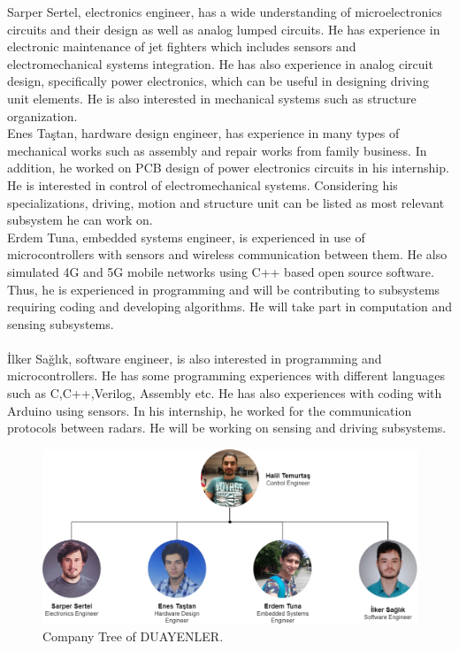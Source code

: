 \documentclass[a4paper,12pt]{article}
\begin{document}
	Sarper Sertel, electronics engineer, has a wide understanding of microelectronics circuits and their design as well as analog lumped circuits. He has experience in electronic maintenance of jet fighters which includes sensors and electromechanical systems integration. He has also experience in  analog circuit design, specifically power electronics, which can be useful in designing driving unit elements. He is also interested in mechanical systems such as structure organization.\\
	
	Enes Taştan, hardware design engineer, has experience in many types of mechanical works such as assembly and repair works from family business. In addition, he worked on PCB design of power electronics circuits in his internship. He is interested in control of electromechanical systems. Considering his specializations, driving, motion and structure unit can be listed as most relevant subsystem he can work on.\\
	
	Erdem Tuna, embedded systems engineer, is experienced in use of microcontrollers with sensors and wireless communication between them. He also simulated 4G and 5G mobile networks using C++ based open source software. Thus, he is experienced in programming and will be contributing to subsystems requiring coding and developing algorithms. He will take part in computation and sensing subsystems.\\
	\\
	
	İlker Sağlık, software engineer, is also interested in programming and microcontrollers. He has some programming experiences with different languages such as C,C++,Verilog, Assembly etc. He has also experiences with coding with Arduino using sensors. In his internship, he worked for the communication protocols between radars. He will be working on sensing and driving subsystems.

\begin{figure}[t!]
	\centering
	\includegraphics[width=\textwidth,height=\textheight,keepaspectratio]{../../Documents/company/company-tree} 
	\caption{\label{fig:company_tree}Company Tree of DUAYENLER.}
\end{figure}
\end{document}
